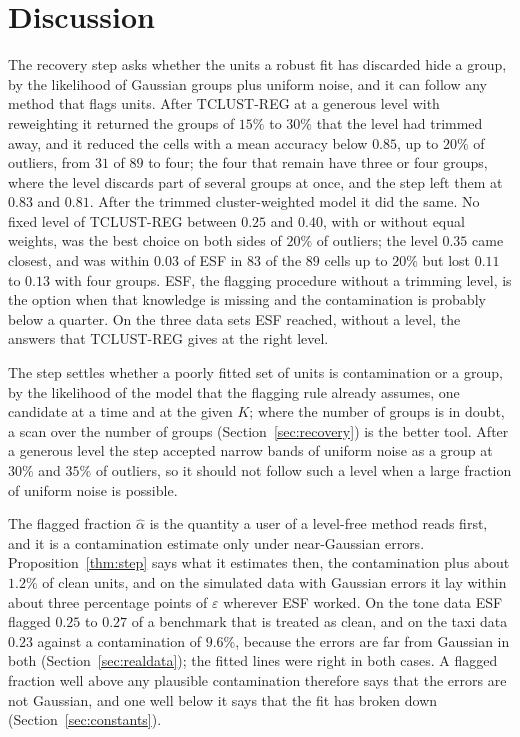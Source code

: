 \section{Discussion}
\label{sec:discussion}

The recovery step asks whether the units a robust fit has discarded hide a group, by the
likelihood of Gaussian groups plus uniform noise, and it can follow any method that flags
units.
After TCLUST-REG at a generous level with reweighting it returned the groups of $15\%$ to $30\%$
that the level had trimmed away, and it reduced the cells with a mean accuracy below $0.85$, up
to $20\%$ of outliers, from $31$ of $89$ to four; the four that remain have three or four
groups, where the level discards part of several groups at once, and the step left them at
$0.83$ and $0.81$. After the trimmed cluster-weighted model it did the same.
No fixed level of TCLUST-REG between $0.25$ and $0.40$, with or without equal weights, was
the best choice on both sides of $20\%$ of outliers; the level $0.35$ came closest, and was
within $0.03$ of ESF in $83$ of the $89$ cells up to $20\%$ but lost $0.11$ to $0.13$ with four groups. ESF, the flagging procedure without a trimming level, is
the option when that knowledge is missing and the contamination is probably below a quarter.
On the three data sets ESF reached, without a level, the answers that TCLUST-REG gives at the
right level.

The step settles whether a poorly fitted set of units is contamination or a group, by the
likelihood of the model that the flagging rule already assumes, one candidate at a time and at
the given $K$; where the number of groups is in doubt, a scan over the number of
groups (Section~\ref{sec:recovery}) is the better tool. After a generous level the
step accepted narrow bands of uniform noise as a group at $30\%$ and $35\%$ of outliers, so it
should not follow such a level when a large fraction of uniform noise is possible.

The flagged fraction $\hat\alpha$ is the quantity a user of a level-free method reads first,
and it is a contamination estimate only under near-Gaussian errors. Proposition~\ref{thm:step}
says what it estimates then, the contamination plus about $1.2\%$ of clean units, and on the
simulated data with Gaussian errors it lay within about three percentage points of
$\varepsilon$ wherever ESF worked. On the tone data ESF flagged $0.25$ to $0.27$ of a benchmark
that is treated as clean, and on the taxi data $0.23$ against a contamination of $9.6\%$,
because the errors are far from Gaussian in both (Section~\ref{sec:realdata}); the fitted
lines were right in both cases. A flagged fraction well above any plausible contamination
therefore says that the errors are not Gaussian, and one well below it says that the fit has
broken down (Section~\ref{sec:constants}).

